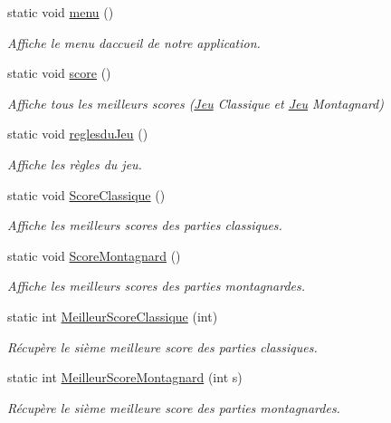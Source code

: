\begin{DoxyCompactItemize}
\mbox{\label{classIHM_a05f1daa32a6db641f74c5d6083c33743}} 
static void \hyperlink{classIHM_a05f1daa32a6db641f74c5d6083c33743}{menu} ()
\begin{DoxyCompactList}\small\item\em Affiche le menu d\textquotesingle{}accueil de notre application. \end{DoxyCompactList}\item 
\mbox{\label{classIHM_a79d4bc8301e8a664c9bfea8d0b2ca916}} 
static void \hyperlink{classIHM_a79d4bc8301e8a664c9bfea8d0b2ca916}{score} ()
\begin{DoxyCompactList}\small\item\em Affiche tous les meilleurs scores (\hyperlink{classJeu}{Jeu} Classique et \hyperlink{classJeu}{Jeu} Montagnard) \end{DoxyCompactList}\item 
\mbox{\label{classIHM_a41f84c5e14ce96d0dc25a42fe214bf3f}} 
static void \hyperlink{classIHM_a41f84c5e14ce96d0dc25a42fe214bf3f}{reglesdu\+Jeu} ()
\begin{DoxyCompactList}\small\item\em Affiche les règles du jeu. \end{DoxyCompactList}\item 
\mbox{\label{classIHM_ac2e668b4fa5ff1491bc15ae0a2d59d1d}} 
static void \hyperlink{classIHM_ac2e668b4fa5ff1491bc15ae0a2d59d1d}{Score\+Classique} ()
\begin{DoxyCompactList}\small\item\em Affiche les meilleurs scores des parties classiques. \end{DoxyCompactList}\item 
\mbox{\label{classIHM_a8f4dce1d816518f673fcafca08fd0ce5}} 
static void \hyperlink{classIHM_a8f4dce1d816518f673fcafca08fd0ce5}{Score\+Montagnard} ()
\begin{DoxyCompactList}\small\item\em Affiche les meilleurs scores des parties montagnardes. \end{DoxyCompactList}\item 
static int \hyperlink{classIHM_a4218e5b720799dd8bada264c7bc0d690}{Meilleur\+Score\+Classique} (int)
\begin{DoxyCompactList}\small\item\em Récupère le sième meilleure score des parties classiques. \end{DoxyCompactList}\item 
static int \hyperlink{classIHM_a068cc2350e9f4fc005ad4378f02d62fa}{Meilleur\+Score\+Montagnard} (int s)
\begin{DoxyCompactList}\small\item\em Récupère le sième meilleure score des parties montagnardes. \end{DoxyCompactList}\end{DoxyCompactItemize}


